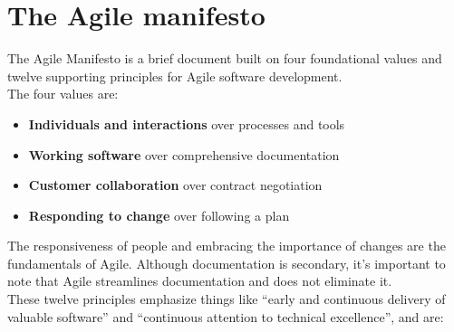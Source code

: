 \section{The Agile manifesto}
	The Agile Manifesto is a brief document built on four foundational values and twelve supporting principles for Agile software development.\\
	The four values are:
	\begin{itemize}
		\item \textbf{Individuals and interactions} over processes and tools
		\item \textbf{Working software} over comprehensive documentation
		\item \textbf{Customer collaboration} over contract negotiation
		\item \textbf{Responding to change} over following a plan
	\end{itemize}
	The responsiveness of people and embracing the importance of changes are the fundamentals of Agile.
	Although documentation is secondary, it's important to note that Agile streamlines documentation and does not eliminate it.\\
	These twelve principles emphasize things like “early and continuous delivery of valuable software” and “continuous attention to technical excellence”, and are: 
